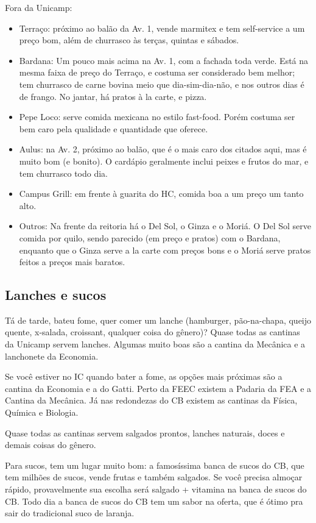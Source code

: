 Fora da Unicamp:

\begin{itemize}
\item Terraço: próximo ao balão da Av. 1, vende marmitex e tem self-service a um
  preço bom, além de churrasco às terças, quintas e sábados.
\item Bardana: Um pouco mais acima na Av. 1, com a fachada toda verde. Está na
  mesma faixa de preço do Terraço, e costuma ser considerado bem melhor; tem
  churrasco de carne bovina meio que dia-sim-dia-não, e nos outros dias é de
  frango. No jantar, há pratos à la carte, e pizza.
\item Pepe Loco: serve comida mexicana no estilo fast-food. Porém costuma ser
  bem caro pela qualidade e quantidade que oferece.
\item Aulus: na Av. 2, próximo ao balão, que é o mais caro dos citados aqui, mas
  é muito bom (e bonito). O cardápio geralmente inclui peixes e frutos do mar, e
  tem churrasco todo dia.
\item Campus Grill: em frente à guarita do HC, comida boa a um preço um tanto
  alto.
\item Outros: Na frente da reitoria há o Del Sol, o Ginza e o Moriá.  O Del Sol
  serve comida por quilo, sendo parecido (em preço e pratos) com o Bardana,
  enquanto que o Ginza serve a la carte com preços bons e o Moriá serve pratos
  feitos a preços mais baratos.
\end{itemize}

\subsection{Lanches e sucos}

Tá de tarde, bateu fome, quer comer um lanche (hamburger, pão-na-chapa, queijo
quente, x-salada, croissant, qualquer coisa do gênero)? Quase todas as cantinas
da Unicamp servem lanches. Algumas muito boas são a cantina da Mecânica e a
lanchonete da Economia.

Se você estiver no IC quando bater a fome, as opções mais próximas são a cantina
da Economia e a do Gatti. Perto da FEEC existem a Padaria da FEA e a Cantina da
Mecânica. Já nas redondezas do CB existem as cantinas da Física, Química e
Biologia.

Quase todas as cantinas servem salgados prontos, lanches naturais, doces e
demais coisas do gênero.

Para sucos, tem um lugar muito bom: a famosíssima banca de sucos do CB, que tem
milhões de sucos, vende frutas e também salgados.  Se você precisa almoçar
rápido, provavelmente sua escolha será salgado + vitamina na banca de sucos do
CB. Todo dia a banca de sucos do CB tem um sabor na oferta, que é ótimo pra sair
do tradicional suco de laranja.

